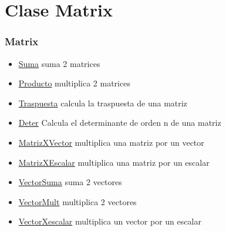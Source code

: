 
\section{Clase Matrix}
\begin{frame}
    \frametitle{Matrix}
    \begin{itemize}
    \item \underline{Suma} suma 2 matrices
    \item \underline{Producto} multiplica 2 matrices
    \item \underline{Traspuesta} calcula la traspuesta de una matriz
    \item \underline{Deter} Calcula el determinante de orden n de una matriz
    \item \underline{MatrizXVector} multiplica una matriz por un vector
    \item \underline{MatrizXEscalar} multiplica una matriz por un escalar
    \item \underline{VectorSuma} suma 2 vectores
    \item \underline{VectorMult} multiplica 2 vectores
    \item \underline{VectorXescalar} multiplica un vector por un escalar
\end{itemize}
\end{frame}